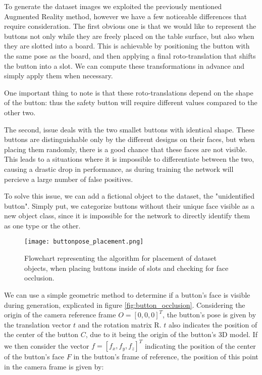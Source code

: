 To generate the dataset images we exploited the previously mentioned Augmented Reality method, however we have a few noticeable differences that require consideration. The first obvious one is that we would like to represent the buttons not only while they are freely placed on the table surface, but also when they are slotted into a board. This is achievable by positioning the button with the same pose as the board, and then applying a final roto-translation that shifts the button into a slot. We can compute these transformations in advance and simply apply them when necessary.

One important thing to note is that these roto-translations depend on the shape of the button: thus the safety button will require different values compared to the other two.

The second, issue deals with the two smallet buttons with identical shape. These buttons are distinguishable only by the different designs on their faces, but when placing them randomly, there is a good chance that these faces are not visible. This leads to a situations where it is impossible to differentiate between the two, causing a drastic drop in performance, as during training the network will percieve a large number of false positives.

To solve this issue, we can add a fictional object to the dataset, the "unidentified button". Simply put, we categorize buttons without their unique face visible as a new object class, since it is impossible for the network to directly identify them as one type or the other.

\begin{figure}[ht]
    \texttt{[image: buttonpose\_placement.png]}
    \caption{Flowchart representing the algorithm for placement of dataset objects, when placing buttons inside of slots and checking for face occlusion.}
    \label{fig:buttonpose_placement}
\end{figure}

We can use a simple geometric method to determine if a button's face is visible during generation, explicated in figure \ref{fig:button_occlusion}. Considering the origin of the camera reference frame $O = [0, 0, 0]^T$, the button's pose is given by the translation vector $t$ and the rotation matrix R. $t$ also indicates the position of the center of the button $C$, due to it being the origin of the button's 3D model. If we then consider the vector $f = [f_x, f_y, f_z]^T$ indicating the position of the center of the button's face $F$ in the button's frame of reference, the position of this point in the camera frame is given by:

